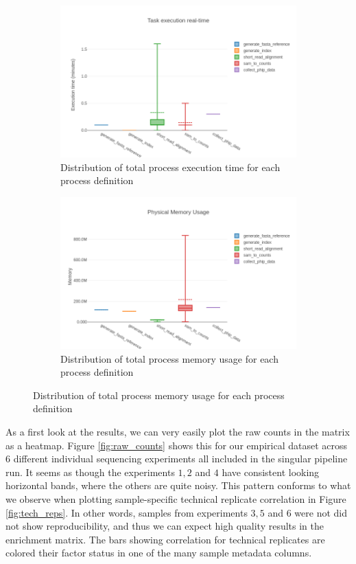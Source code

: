 \documentclass{article}
\begin{document}
\begin{figure}
\begin{subfigure}{.5\textwidth}
  \centering
  \includegraphics[width=.8\linewidth]{figures/time.png}  
  \caption{Distribution of total process execution time for each process definition}
  \label{fig:sub-first}
\end{subfigure}
\begin{subfigure}{.5\textwidth}
  \centering
  \includegraphics[width=.8\linewidth]{figures/memory.png}  
  \caption{Distribution of total process memory usage for each process definition}
  \label{fig:sub-second}
\end{subfigure}
\end{figure}

As a first look at the results, we can very easily plot the raw counts in the matrix as a heatmap.
Figure \ref{fig:raw_counts} shows this for our empirical dataset across 6 different individual sequencing experiments all included in the singular pipeline run.
It seems as though the experiments $1, 2$ and $4$ have consistent looking horizontal bands, where the others are quite noisy.
This pattern conforms to what we observe when plotting sample-specific technical replicate correlation in Figure \ref{fig:tech_reps}.
In other words, samples from experiments $3, 5$ and $6$ were not did not show reproducibility, and thus we can expect high quality results in the enrichment matrix.
The bars showing correlation for technical replicates are colored their factor status in one of the many sample metadata columns.
\end{document}
